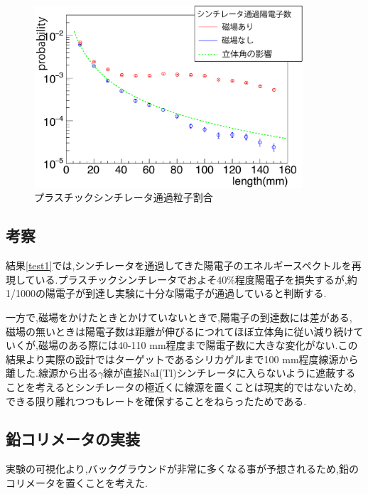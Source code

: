 \begin{figure}[htbp]
	\centering
		\includegraphics[width=10cm]{fig/scinti_test.pdf}
	\caption{プラスチックシンチレータ通過粒子割合}
	\label{scinti_test}
\end{figure}

\subsection{考察}

結果\ref{test1}では,シンチレータを通過してきた陽電子のエネルギースペクトルを再現している.プラスチックシンチレータでおよそ40\%程度陽電子を損失するが,約1/1000の陽電子が到達し実験に十分な陽電子が通過していると判断する.

一方で,磁場をかけたときとかけていないときで,陽電子の到達数には差がある,
磁場の無いときは陽電子数は距離が伸びるにつれてほぼ立体角に従い減り続けていくが,磁場のある際には40-110 mm程度まで陽電子数に大きな変化がない.この結果より実際の設計ではターゲットであるシリカゲルまで100 mm程度線源から離した.線源から出る$\gamma$線が直接NaI(Tl)シンチレータに入らないように遮蔽することを考えるとシンチレータの極近くに線源を置くことは現実的ではないため,できる限り離れつつもレートを確保することをねらったためである.

\subsection{鉛コリメータの実装}
実験の可視化より,バックグラウンドが非常に多くなる事が予想されるため,鉛のコリメータを置くことを考えた.

